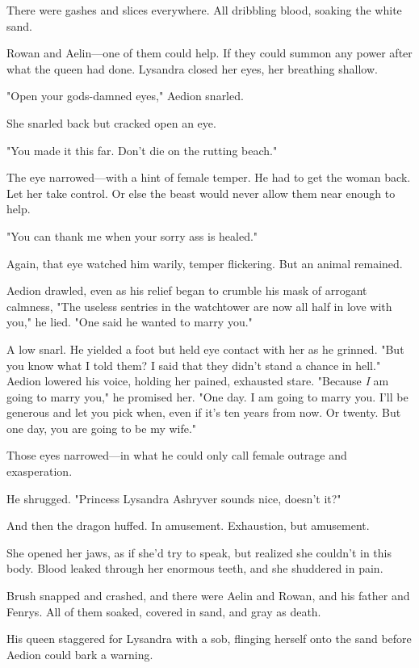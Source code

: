 There were gashes and slices everywhere.
All dribbling blood, soaking the white sand.

Rowan and Aelin---one of them could help.
If they could summon any power after what the queen had done.
Lysandra closed her eyes, her breathing shallow.

"Open your gods-damned eyes," Aedion snarled.

She snarled back but cracked open an eye.

"You made it this far.
Don't die on the rutting beach."

The eye narrowed---with a hint of female temper.
He had to get the woman back.
Let her take control.
Or else the beast would never allow them near enough to help.

"You can thank me when your sorry ass is healed."

Again, that eye watched him warily, temper flickering.
But an animal remained.

Aedion drawled, even as his relief began to crumble his mask of arrogant calmness, "The useless sentries in the watchtower are now all half in love with you," he lied.
"One said he wanted to marry you."

A low snarl.
He yielded a foot but held eye contact with her as he grinned.
"But you know what I told them?
I said that they didn't stand a chance in hell."
Aedion lowered his voice, holding her pained, exhausted stare.
"Because \emph{I} am going to marry you," he promised her.
"One day.
I am going to marry you.
I'll be generous and let you pick when, even if it's ten years from now.
Or twenty.
But one day, you are going to be my wife."

Those eyes narrowed---in what he could only call female outrage and exasperation.

He shrugged.
"Princess Lysandra Ashryver sounds nice, doesn't it?"

And then the dragon huffed.
In amusement.
Exhaustion, but 
amusement.

She opened her jaws, as if she'd try to speak, but realized she couldn't in this body.
Blood leaked through her enormous teeth, and she shuddered in pain.

Brush snapped and crashed, and there were Aelin and Rowan, and his father and Fenrys.
All of them soaked, covered in sand, and gray as death.

His queen staggered for Lysandra with a sob, flinging herself onto the sand before Aedion could bark a warning.

